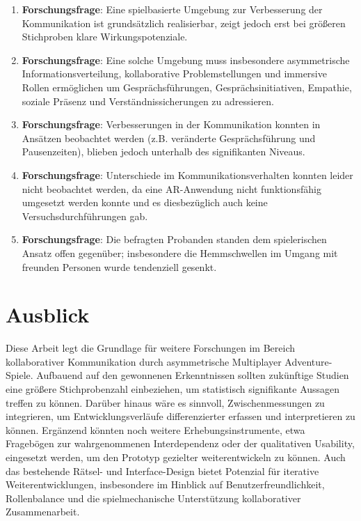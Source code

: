 \begin{enumerate}
    \item \textbf{Forschungsfrage}: Eine spielbasierte Umgebung zur Verbesserung der Kommunikation ist grundsätzlich realisierbar, zeigt jedoch erst bei größeren Stichproben klare Wirkungspotenziale.
    \item \textbf{Forschungsfrage}: Eine solche Umgebung muss insbesondere asymmetrische Informationsverteilung, kollaborative Problemstellungen und immersive Rollen ermöglichen um Gesprächsführungen, Gesprächsinitiativen, Empathie, soziale Präsenz und Verständnissicherungen zu adressieren.
    \item \textbf{Forschungsfrage}: Verbesserungen in der Kommunikation konnten in Ansätzen beobachtet werden (z.B. veränderte Gesprächsführung und Pausenzeiten), blieben jedoch unterhalb des signifikanten Niveaus.
    \item \textbf{Forschungsfrage}: Unterschiede im Kommunikationsverhalten konnten leider nicht beobachtet werden, da eine \ac{AR}-Anwendung nicht funktionsfähig umgesetzt werden konnte und es diesbezüglich auch keine Versuchsdurchführungen gab.
    \item \textbf{Forschungsfrage}: Die befragten Probanden standen dem spielerischen Ansatz offen gegenüber; insbesondere die Hemmschwellen im Umgang mit freunden Personen wurde tendenziell gesenkt.
\end{enumerate}

\section{Ausblick}\label{sec:prospect}

Diese Arbeit legt die Grundlage für weitere Forschungen im Bereich kollaborativer Kommunikation durch asymmetrische Multiplayer Adventure-Spiele.
Aufbauend auf den gewonnenen Erkenntnissen sollten zukünftige Studien eine größere Stichprobenzahl einbeziehen, um statistisch signifikante Aussagen treffen zu können. Darüber hinaus wäre es sinnvoll, Zwischenmessungen zu integrieren, um Entwicklungsverläufe differenzierter erfassen und interpretieren zu können. Ergänzend könnten noch weitere Erhebungsinstrumente, etwa Fragebögen zur wahrgenommenen Interdependenz oder der qualitativen Usability, eingesetzt werden, um den Prototyp gezielter weiterentwickeln zu können. Auch das bestehende Rätsel- und Interface-Design bietet Potenzial für iterative Weiterentwicklungen, insbesondere im Hinblick auf Benutzerfreundlichkeit, Rollenbalance und die spielmechanische Unterstützung kollaborativer Zusammenarbeit.

